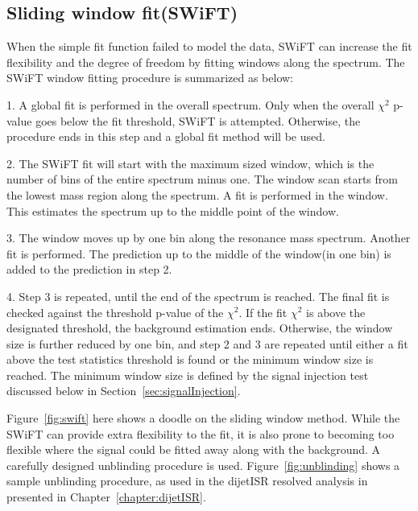     \subsection{Sliding window fit(SWiFT)}
    When the simple fit function failed to model the data, SWiFT can increase the fit flexibility and the degree of freedom by fitting windows along the spectrum. The SWiFT window fitting procedure is summarized as below:
    
    1. A global fit is performed in the overall spectrum. Only when the overall $\chi^{2}$ p-value goes below the fit threshold, SWiFT is attempted. Otherwise, the procedure ends in this step and a global fit method will be used. 

    2. The SWiFT fit will start with the maximum sized window, which is the number of bins of the entire spectrum minus one. The window scan starts from the lowest mass region along the spectrum. A fit is performed in the window. This estimates the spectrum up to the middle point of the window.

    3. The window moves up by one bin along the resonance mass spectrum. Another fit is performed. The prediction up to the middle of the window(in one bin) is added to the prediction in step 2. 

    4. Step 3 is repeated, until the end of the spectrum is reached. The final fit is checked against the threshold p-value of the $\chi^{2}$. If the fit $\chi^{2}$ is above the designated threshold, the background estimation ends. Otherwise, the window size is further reduced by one bin, and step 2 and 3 are repeated until either a fit above the test statistics threshold is found or the minimum window size is reached. The minimum window size is defined by the signal injection test discussed
    below in Section~\ref{sec:signalInjection}.

    Figure~\ref{fig:swift} here shows a doodle on the sliding window method.
    While the SWiFT can provide extra flexibility to the fit, it is also prone to becoming too flexible where the signal could be fitted away along with the background. A carefully designed unblinding procedure is used. Figure~\ref{fig:unblinding} shows a sample unblinding procedure, as used in the dijetISR resolved analysis in presented in Chapter~\ref{chapter:dijetISR}.

